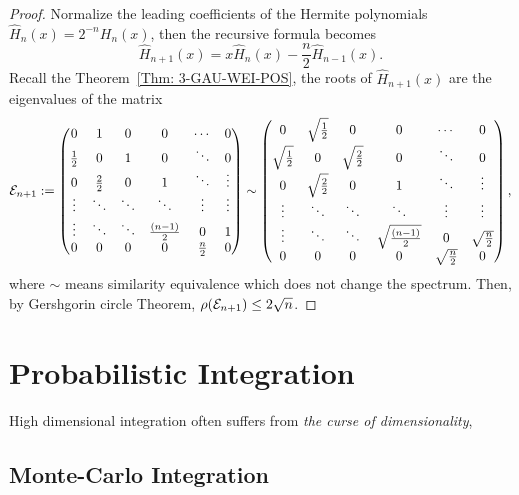 \begin{proof}
    Normalize the leading coefficients of the Hermite polynomials $\hat{H}_n(x) = 2^{-n} H_n(x)$, then the recursive formula becomes 
    \begin{equation}
        \hat{H}_{n+1}(x) = x \hat{H}_n(x) - \frac{n}{2} \hat{H}_{n-1}(x).
    \end{equation}
    Recall the Theorem~\ref{Thm: 3-GAU-WEI-POS}, the roots of $\hat{H}_{n+1}(x)$ are the eigenvalues of the matrix 
\begin{equation}
       \mathcal E_{n+1}:= \begin{pmatrix}
           0 & 1 & 0 & 0 & \cdots & 0\\
           \frac{1}{2} & 0 & 1 & 0 & \ddots & 0\\ 
           0 & \frac{2}{2} & 0 &  1 & \ddots & \vdots  \\
           \vdots & \ddots & \ddots & \ddots & \vdots & \vdots \\
           \vdots & \ddots & \ddots & \frac{(n-1)}{2} & 0 & 1 \\
           0 & 0 & 0 & 0 & \frac{n}{2} & 0
       \end{pmatrix} \sim \begin{pmatrix}
           0 &  \sqrt{\frac{1}{2}} & 0 & 0 & \cdots & 0\\
           \sqrt{\frac{1}{2}} & 0 &  \sqrt{\frac{2}{2}} & 0 & \ddots & 0\\ 
           0 &  \sqrt{\frac{2}{2}} & 0 &  1 & \ddots & \vdots  \\
           \vdots & \ddots & \ddots & \ddots & \vdots & \vdots \\
           \vdots & \ddots & \ddots & \sqrt{\frac{(n-1)}{2}} & 0 & \sqrt{\frac{n}{2}} \\
           0 & 0 & 0 & 0 & \sqrt{\frac{n}{2}} & 0
       \end{pmatrix},
   \end{equation}
   where $\sim$ means similarity equivalence which does not change the spectrum. Then, by Gershgorin circle Theorem, $\rho(\mathcal E_{n+1}) \le 2 \sqrt{n}$.  
\end{proof}

\section{Probabilistic Integration}
High dimensional integration often suffers from \emph{the curse of dimensionality}, 
\subsection{Monte-Carlo Integration}
